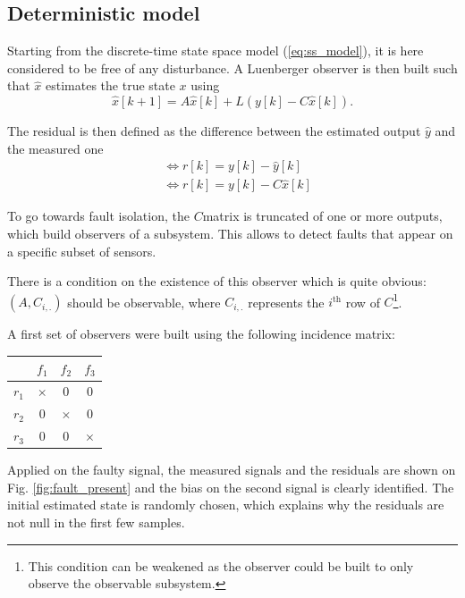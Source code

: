 \documentclass[conference]{IEEEtran}
\begin{document}
\subsection{Deterministic model}
\label{sec:Luenberger_observer}

Starting from the discrete-time state space model (\ref{eq:ss_model}), it is here considered to be free of any disturbance. A Luenberger observer is then built such that $\hat{x}$ estimates the true state $x$ using
\begin{equation}
    \hat{x}[k+1] = A\hat{x}[k] + L \left(y[k] - C\hat{x}[k]\right).
\end{equation}

The residual is then defined as the difference between the estimated output $\hat{y}$ and the measured one
\begin{equation}
    \begin{aligned}
        &\Leftrightarrow r[k] = y[k] - \hat{y}[k] \\
        &\Leftrightarrow r[k] = y[k] - C \hat{x}[k]
    \end{aligned}
    \label{eq:Luenberger_residual}
\end{equation}

To go towards fault isolation, the $C$matrix is truncated of one or more outputs, which build observers of a subsystem. This allows to detect faults that appear on a specific subset of sensors.

There is a condition on the existence of this observer which is quite obvious: $(A, C_{i, .})$ should be observable, where $C_{i,.}$ represents the $i^{\text{th}}$ row of $C$\footnote{This condition can be weakened as the observer could be built to only observe the observable subsystem.}.

A first set of observers were built using the following incidence matrix:

\begin{table}[htbp]
    \centering
    \begin{tabular}{c|ccc}
        & $f_1$ & $f_2$ & $f_3$ \\
        \hline
        $r_1$ & $\times$ & 0 & 0 \\
        $r_2$ & 0 & $\times$ & 0 \\
        $r_3$ & 0 & 0 & $\times$ \\
    \end{tabular}
\end{table}

Applied on the faulty signal, the measured signals and the residuals are shown on Fig. \ref{fig:fault_present} and the bias on the second signal is clearly identified. The initial estimated state is randomly chosen, which explains why the residuals are not null in the first few samples.
\end{document}
